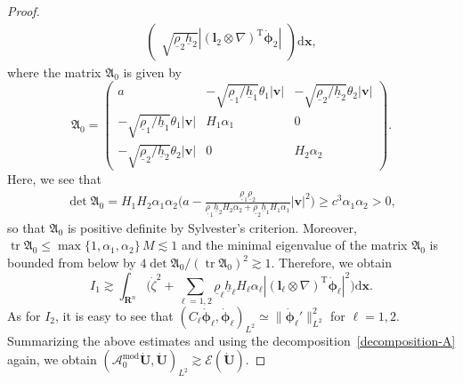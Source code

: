 \documentclass[11pt,leqno]{article}
\numberwithin{equation}{section}
\numberwithin{figure}{section}
\begin{document}
\begin{proof}
\begin{align*}
\begin{pmatrix}
 \sqrt{ \underline{\rho}_2\underline{h}_2 } |(\bm{l}_2\otimes\nabla)^\mathrm{T}\dot{\bm{\phi}}_2|
\end{pmatrix}
\mathrm{d}\bm{x},
\end{align*}
%
where the matrix $\mathfrak{A}_0$ is given by 
%
\[
\mathfrak{A}_0 = 
\begin{pmatrix}
 a & - \sqrt{\underline{\rho}_1/\underline{h}_1} \theta_1|\bm{v}|
  & - \sqrt{\underline{\rho}_2/\underline{h}_2} \theta_2|\bm{v}| \\
 - \sqrt{\underline{\rho}_1/\underline{h}_1} \theta_1|\bm{v}| & H_1\alpha_1 & 0 \\
 - \sqrt{\underline{\rho}_2/\underline{h}_2} \theta_2|\bm{v}| & 0 & H_2\alpha_2
\end{pmatrix}.
\]
%
Here, we see that 
%
\begin{align*}
\det\mathfrak{A}_0
= H_1H_2\alpha_1\alpha_2\biggl( a
 - \frac{ \underline{\rho}_1\underline{\rho}_2 }{ \underline{\rho}_1\underline{h}_2H_2\alpha_2
  + \underline{\rho}_2\underline{h}_1H_1\alpha_1 }|\bm{v}|^2 \biggr)
\geq c^3\alpha_1\alpha_2 > 0,
\end{align*}
%
so that $\mathfrak{A}_0$ is positive definite by Sylvester's criterion. 
Moreover, $\operatorname{tr}\mathfrak{A}_0 \leq \max\{1,\alpha_1,\alpha_2\}\, M \lesssim 1$ 
and the minimal eigenvalue of the matrix $\mathfrak{A}_0$ is bounded from below by 
$4\det\mathfrak{A}_0/(\operatorname{tr}\mathfrak{A}_0)^2 \gtrsim 1$. 
Therefore, we obtain 
%
\[
I_1 \gtrsim \int_{\mathbf{R}^n} \biggl( \dot{\zeta}^2
 + \sum_{\ell=1,2}\underline{\rho}_\ell\underline{h}_\ell H_\ell\alpha_\ell
  |(\bm{l}_\ell\otimes\nabla)^\mathrm{T}\dot{\bm{\phi}}_\ell|^2 \biggr)\mathrm{d}\bm{x}.
\]
%
As for $I_2$, it is easy to see that 
$(C_\ell\dot{\bm{\phi}}_\ell,\dot{\bm{\phi}}_\ell)_{L^2} \simeq \|\dot{\bm{\phi}}_\ell'\|_{L^2}^2$ for $\ell=1,2$. 
Summarizing the above estimates and using the decomposition~\eqref{decomposition-A} again, we obtain 
$(\mathscr{A}_0^\mathrm{mod}\dot{\bm{U}},\dot{\bm{U}})_{L^2} \gtrsim \mathscr{E}(\dot{\bm{U}})$. 



\end{proof}
\end{document}
